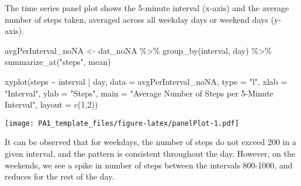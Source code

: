 \documentclass[
]{article}
\newenvironment{Shaded}{\begin{snugshade}}{\end{snugshade}}
\newcommand{\AttributeTok}[1]{\textcolor[rgb]{0.77,0.63,0.00}{#1}}
\newcommand{\DecValTok}[1]{\textcolor[rgb]{0.00,0.00,0.81}{#1}}
\newcommand{\FunctionTok}[1]{\textcolor[rgb]{0.00,0.00,0.00}{#1}}
\newcommand{\NormalTok}[1]{#1}
\newcommand{\OtherTok}[1]{\textcolor[rgb]{0.56,0.35,0.01}{#1}}
\newcommand{\SpecialCharTok}[1]{\textcolor[rgb]{0.00,0.00,0.00}{#1}}
\newcommand{\StringTok}[1]{\textcolor[rgb]{0.31,0.60,0.02}{#1}}
\begin{document}
The time series panel plot shows the 5-minute interval (x-axis) and the
average number of steps taken, averaged across all weekday days or
weekend days (y-axis).

\begin{Shaded}
\begin{Highlighting}[]
\NormalTok{avgPerInterval\_noNA }\OtherTok{\textless{}{-}}\NormalTok{ dat\_noNA }\SpecialCharTok{\%\textgreater{}\%}
                \FunctionTok{group\_by}\NormalTok{(interval, day) }\SpecialCharTok{\%\textgreater{}\%}
                \FunctionTok{summarize\_at}\NormalTok{(}\StringTok{"steps"}\NormalTok{, mean)}

\FunctionTok{xyplot}\NormalTok{(steps }\SpecialCharTok{\textasciitilde{}}\NormalTok{ interval }\SpecialCharTok{|}\NormalTok{ day, }\AttributeTok{data =}\NormalTok{ avgPerInterval\_noNA, }\AttributeTok{type =} \StringTok{"l"}\NormalTok{, }
       \AttributeTok{xlab =} \StringTok{"Interval"}\NormalTok{, }\AttributeTok{ylab =} \StringTok{"Steps"}\NormalTok{, }
       \AttributeTok{main =} \StringTok{"Average Number of Steps per 5{-}Minute Interval"}\NormalTok{, }\AttributeTok{layout =} \FunctionTok{c}\NormalTok{(}\DecValTok{1}\NormalTok{,}\DecValTok{2}\NormalTok{))}
\end{Highlighting}
\end{Shaded}

\texttt{[image: PA1\_template\_files/figure-latex/panelPlot-1.pdf]}

It can be observed that for weekdays, the number of steps do not exceed
200 in a given interval, and the pattern is consistent throughout the
day. However, on the weekends, we see a spike in number of steps between
the intervals 800-1000, and reduces for the rest of the day.
\end{document}
